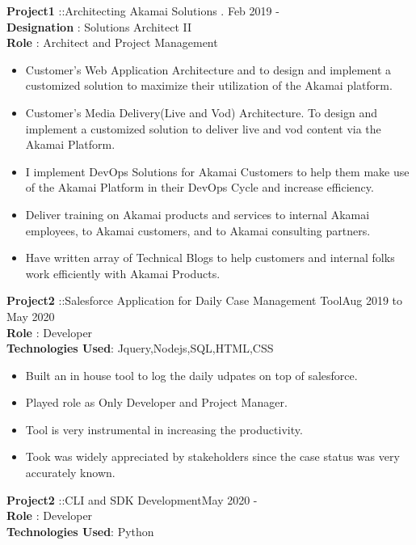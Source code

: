 \documentclass{resumeclass}
\begin{document}
\begin{resume}
  
  \textbf{Project1} ::Architecting Akamai Solutions . \hfill      Feb 2019 - \\
  \textbf{Designation} : Solutions Architect II \\
  \textbf{Role} : Architect and Project Management 

   \begin{itemize} \itemsep -2pt
    \item Customer’s Web Application Architecture and to design and implement a customized solution to maximize their utilization of the Akamai platform.
    \item Customer’s Media Delivery(Live and Vod) Architecture. To design and implement a customized solution to deliver live and vod content via the Akamai Platform.
    \item I implement DevOps Solutions for Akamai Customers to help them make use of the Akamai Platform in their DevOps Cycle and increase efficiency.
    \item Deliver training on Akamai products and services to internal Akamai employees, to Akamai customers, and to Akamai consulting partners.
    \item Have written array of Technical Blogs to help customers and internal folks work efficiently with Akamai Products.
  \end{itemize} \vspace{-6pt}
  
  
  \textbf{Project2} ::Salesforce Application for Daily Case Management Tool\hfill      Aug 2019 to May 2020 \\
  \textbf{Role} : Developer \\
  \textbf{Technologies Used}: Jquery,Nodejs,SQL,HTML,CSS
  
   \begin{itemize} \itemsep -2pt
    \item Built an in house tool to log the daily udpates on top of salesforce. 
    \item Played role as Only Developer and Project Manager. 
    \item Tool is very instrumental in increasing the productivity.
    \item Took was widely appreciated by stakeholders since the case status was very accurately known.
  \end{itemize} \vspace{-6pt}

  \textbf{Project2} ::CLI and SDK Development\hfill      May 2020 - \\
  \textbf{Role} : Developer \\
  \textbf{Technologies Used}: Python
  

\end{resume}
\end{document}
